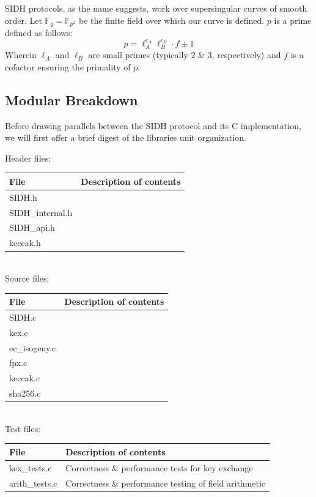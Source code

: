 SIDH protocols, as the name suggests, work over supersingular curves of smooth order. Let $\mathbb{F}_q = \mathbb{F}_{p^2}$ be the finite field over which our curve is defined. $p$ is a prime defined as follows:
$$
p = \ell_{A}^{e_A}\ell_{B}^{e_B} \cdot f \pm 1
$$
Wherein $\ell_{A}$ and $\ell_{B}$ are small primes (typically 2 \& 3, respectively) and $f$ is a cofactor ensuring the primality of $p$. 

\subsection{Modular Breakdown}

	Before drawing parallels between the SIDH protocol and its C implementation, we will first offer a brief digest of the libraries unit organization.\\

\begin{center}
Header files:\\
	\begin{tabular}{@{}ll@{}}
		File & Description of contents\\
		\toprule
		SIDH.h & \\
		\midrule
		SIDH\_internal.h & \\
		\midrule
		SIDH\_api.h & \\
		\midrule
		keccak.h & \\
		\bottomrule
	\end{tabular}\\
	
Source files:\\
	\begin{tabular}{@{}ll@{}}
		File & Description of contents\\
		\toprule
		SIDH.c & \\
		\midrule
		kex.c & \\
		\midrule
		ec\_isogeny.c & \\
		\midrule
		fpx.c & \\
		\midrule
		keccak.c & \\
		\midrule
		sha256.c & \\
		\bottomrule
	\end{tabular}\\
	
Test files:\\
	\begin{tabular}{@{}ll@{}}
		File & Description of contents\\
		\toprule
		kex\_tests.c & Correctness \& performance tests for key exchange\\
		\midrule
		arith\_tests.c & Correctness \& performance testing of field arithmetic\\
		\bottomrule
	\end{tabular}
\end{center}

